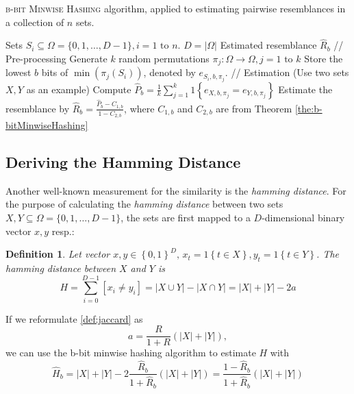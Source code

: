 \documentclass[a4paper]{article}
\newtheorem{mydef}{Definition}
\begin{document}
\begin{algorithm}[H]
\caption{\textsc{b-bit Minwise Hashing} algorithm, applied to estimating pairwise resemblances in a collection of $n$ sets.}
\label{alg:minwiseHashing}
\begin{algorithmic}
\Require Sets $S_i \subseteq \Omega = \{0,1,\ldots,D-1\}, i = 1 \text{ to } n$. \Comment $D = \left| \Omega \right|$
\Ensure Estimated resemblance $\hat{R}_b$
\State // Pre-processing
\State Generate $k$ random permutations $\pi_j: \Omega\longrightarrow\Omega, j=1\text{ to }k$
	\State Store the lowest $b$ bits of $\min(\pi_j(S_i))$, denoted by $e_{S_i,b,\pi_j}$.
\EndFor
\State
\State // Estimation (Use two sets $X,Y$ as an example)
\State Compute $\hat{P}_b = \frac{1}{k}\sum_{j=1}^k 1 \left\lbrace  e_{X,b,\pi_j } = e_{Y,b,\pi_j } \right\rbrace$
\State Estimate the resemblance by $\hat{R}_b = \frac{\hat{P}_b-C_{1,b}}{1-C_{2,b}}$, where $C_{1,b}$ and $C_{2,b}$ are from Theorem \vref{the:b-bitMinwiseHashing}
\end{algorithmic}
\end{algorithm}


\subsection{Deriving the Hamming Distance} \label{sec:hammingDistance}

Another well-known measurement for the similarity is the \emph{hamming distance}. For the purpose of calculating the \emph{hamming distance} between two sets $X,Y \subseteq \Omega = \{0,1,\ldots,D-1\}$, the sets are first mapped to a $D$-dimensional binary vector $x,y$ resp.:
\begin{framed}
\begin{mydef}\label{def:hamming}
Let vector $x,y \in \left\lbrace 0,1 \right\rbrace ^D, \, x_t = 1\left\lbrace t \in X \right\rbrace, y_t = 1\left\lbrace t \in Y \right\rbrace$. The \emph{hamming distance} between $X$ and $Y$ is
\begin{equation}
H=\sum_{i=0}^{D-1}\left[ x_i \neq y_i \right]=|X \cup Y|-|X\cap Y|=|X|+|Y|-2a
\end{equation}
\end{mydef}
\end{framed}

If we reformulate \vref{def:jaccard} as
\begin{equation}
a=\frac{R}{1+R}(|X|+|Y|),
\end{equation}
we can use the b-bit minwise hashing algorithm to estimate $H$ with
\begin{equation}
\hat{H}_b=|X|+|Y|-2\frac{\hat{R}_b}{1+\hat{R}_b}(|X|+|Y|)=\frac{1-\hat{R}_b}{1+\hat{R}_b}(|X|+|Y|)
\end{equation}
\end{document}
